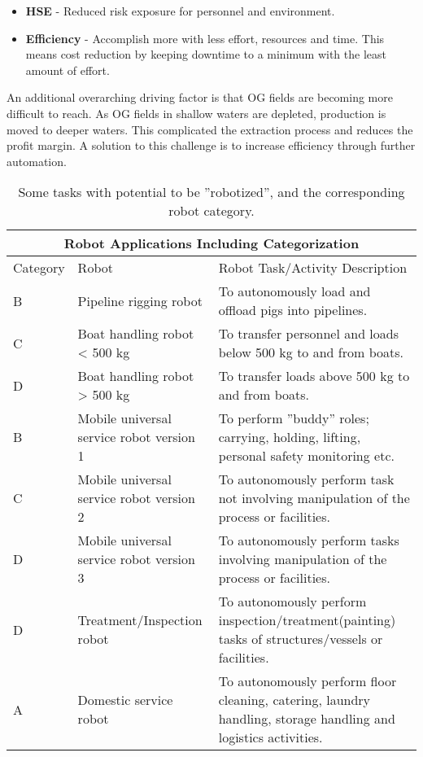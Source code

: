 \begin{itemize}
	\item \textbf{HSE} - Reduced risk exposure for personnel and environment. 
	\item \textbf{Efficiency} - Accomplish more with less effort, resources and time. This means cost reduction by keeping downtime to a minimum with the least amount of effort.
\end{itemize} 

An additional overarching driving factor is that \ac{OG} fields are becoming more difficult to reach. As \ac{OG} fields in shallow waters are depleted, production is moved to deeper waters. This complicated the extraction process and reduces the profit margin. A solution to this challenge is to increase efficiency through further automation.

\begin{table}
\centering
\begin{tabular}{ |p{2cm} p{3cm} p{5cm}| }
\hline
\multicolumn{3}{|c|}{Robot Applications Including Categorization}\\
\hline\hline
Category & Robot & Robot Task/Activity Description \\ 
\hline
B & Pipeline rigging robot & To autonomously load and offload pigs into pipelines. \\
C & Boat handling robot < 500 kg & To transfer personnel and loads below 500 kg to and from boats.\\
D & Boat handling robot > 500 kg & To transfer loads above 500 kg to and from boats.\\
\hline
B & Mobile universal service robot version 1 & To perform ''buddy'' roles; carrying, holding, lifting, personal safety monitoring etc. \\
C & Mobile universal service robot version 2 & To autonomously perform task not involving manipulation of the process or facilities.\\
D & Mobile universal service robot version 3 & To autonomously perform tasks involving manipulation of the process or facilities. \\
D & Treatment/Inspection robot & To autonomously perform inspection/treatment(painting) tasks of structures/vessels or facilities.\\
\hline
A & Domestic service robot & To autonomously perform floor cleaning, catering, laundry handling, storage handling and logistics activities. \\
\hline\hline 
\end{tabular}
\caption{Some tasks with potential to be ''robotized'', and the corresponding robot category\cite{6094661}.} 
\label{tab:tasks_capabilities}
\end{table}

